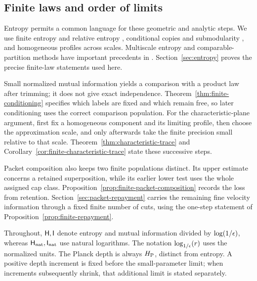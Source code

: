\subsection{Finite laws and order of limits}

Entropy permits a common language for these geometric and analytic
steps. We use finite entropy and relative entropy
\citep{Shannon1948,KullbackLeibler1951}, conditional copies and
submodularity \citep{Tao2010Entropy}, and homogeneous profiles across
scales. Multiscale entropy and comparable-partition methods have
important precedents in \citet{HochmanShmerkin2012,Hochman2014}.
Section~\ref{sec:entropy} proves the precise finite-law statements
used here.

Small normalized mutual information yields a comparison with a product
law after trimming; it does not give exact independence.
Theorem~\ref{thm:finite-conditioning} specifies which labels are fixed
and which remain free, so later conditioning uses the correct comparison
population. For the characteristic-plane argument, first fix a
homogeneous component and its limiting profile, then choose the
approximation scale, and only afterwards take the finite precision
small relative to that scale.
Theorem~\ref{thm:characteristic-trace} and
Corollary~\ref{cor:finite-characteristic-trace} state these successive
steps.

Packet composition also keeps two finite populations distinct. Its
upper estimate concerns a retained superposition, while its earlier
lower test uses the whole assigned cap class.
Proposition~\ref{prop:finite-packet-composition} records the loss from
retention. Section~\ref{sec:packet-repayment} carries the remaining
fine velocity information through a fixed finite number of cuts,
using the one-step statement of Proposition~\ref{prop:finite-repayment}.

Throughout, \(\mathsf H,\mathsf I\) denote entropy and mutual information divided
by \(\log(1/\epsilon)\), whereas \(\mathsf H_{\mathrm{nat}},\mathsf I_{\mathrm{nat}}\) use natural logarithms.
The notation \(\log_{1/\epsilon}\!\left(r\right)\) uses the normalized units. The Planck depth
is always \(H_{\mathrm P}\), distinct from entropy. A positive depth increment
is fixed before the small-parameter limit; when increments subsequently
shrink, that additional limit is stated separately.
